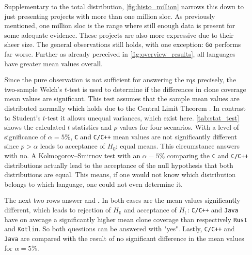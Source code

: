 Supplementary to the total distribution, \autoref{fig:histo_million} narrows this down to just presenting projects with more than one million \acl{sloc}. As previously mentioned, one million \ac{sloc} is the range where still enough data is present for some adequate evidence. These projects are also more expressive due to their sheer size. The general observations still holds, with one exception: \texttt{Go} performs far worse. Further as already perceived in \autoref{fig:overview_results}, all languages have greater mean values overall.

Since the pure observation is not sufficient for answering the \aclp{rq} precisely, the two-sample Welch's $t$-test is used to determine if the differences in clone coverage mean values are significant. This test assumes that the sample mean values are distributed normally which holds due to the Central Limit Theorem \cite{shafer2022introductory}. In contrast to Student's $t$-test it allows unequal variances, which exist here. \autoref{tab:stat_test} shows the calculated $t$ statistics and $p$ values for four scenarios. With a level of significance of $\alpha = 5\%$, \texttt{C} and \texttt{C/C++} mean values are not significantly different since $p > \alpha$ leads to acceptance of $H_0$: equal means. This circumstance answers  with no.
A Kolmogorov–Smirnov test with an $\alpha=5\%$ comparing the \texttt{C} and \texttt{C/C++} distributions actually lead to the acceptance of the null hypothesis that both distributions are equal. This means, if one would not know which distribution belongs to which language, one could not even determine it.

The next two rows answer  and . In both cases are the mean values significantly different, which leads to rejection of $H_0$ and acceptance of $H_1$: \texttt{C/C++} and \texttt{Java} have on average a significantly higher mean clone coverage than respectively \texttt{Rust} and \texttt{Kotlin}. So both questions can be answered with "yes".
Lastly, \texttt{C/C++} and \texttt{Java} are compared with the result of no significant difference in the mean values for $\alpha = 5\%$.


